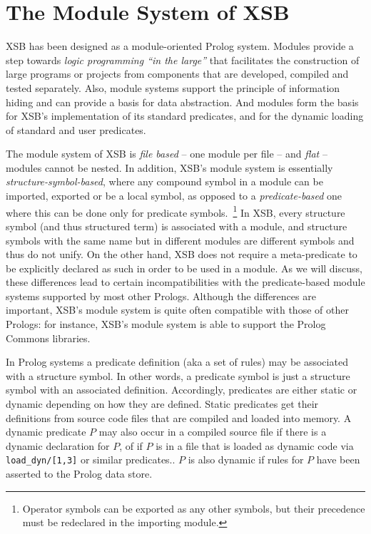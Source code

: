 

\section{The Module System of XSB} \label{Modules}

XSB has been designed as a module-oriented Prolog system.  Modules
provide a step towards {\em logic programming ``in the large''} that
facilitates the construction of large programs or projects from
components that are developed, compiled and tested separately.  Also,
module systems support the principle of information hiding and can
provide a basis for data abstraction.  And modules form the basis for
XSB's implementation of its standard predicates, and for the dynamic
loading of standard and user predicates.

The module system of XSB is {\em file based} -- one module per file --
and {\em flat} -- modules cannot be nested.  In addition, XSB's module
system is essentially {\em structure-symbol-based}, where any compound
symbol in a module can be imported, exported or be a local symbol, as
opposed to a {\em predicate-based} one where this can be done only for
predicate symbols.~\footnote{Operator symbols can be exported as any
  other symbols, but their precedence must be redeclared in the
  importing module.}  In XSB, every structure symbol (and thus
structured term) is associated with a module, and structure symbols
with the same name but in different modules are different symbols and
thus do not unify.  On the other hand, XSB does not require a
meta-predicate to be explicitly declared as such in order to be used
in a module.  As we will discuss, these differences lead to certain
incompatibilities with the predicate-based module systems supported by
most other Prologs.  Although the differences are important, XSB's
module system is quite often compatible with those of other Prologs:
for instance, XSB's module system is able to support the Prolog
Commons libraries.

In Prolog systems a predicate definition (aka a set of rules) may be
associated with a structure symbol.  In other words, a predicate
symbol is just a structure symbol with an associated definition.
Accordingly, predicates are either static or dynamic depending on how
they are defined.  Static predicates get their definitions from source
code files that are compiled and loaded into memory.  A dynamic
predicate $P$ may also occur in a compiled source file if there is a
dynamic declaration for $P$, of if $P$ is in a file that is loaded as
dynamic code via {\tt load\_dyn/[1,3]} or similar predicates..  $P$ is
also dynamic if rules for $P$ have been asserted to the Prolog data
store.

